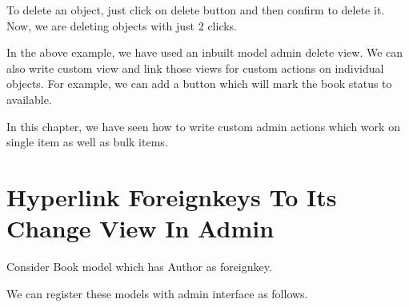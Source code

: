 \documentclass[letterpaper,11pt,english]{sphinxmanual}
\begin{document}
To delete an object, just click on delete button and then confirm to delete it. Now, we are deleting objects with just 2 clicks.

In the above example, we have used an inbuilt model admin delete view. We can also write custom view and link those views for custom actions on individual objects. For example, we can add a button which will mark the book status to available.

In this chapter, we have seen how to write custom admin actions which work on single item as well as bulk items.


\chapter{Hyperlink Foreignkeys To Its Change View In Admin}
\label{\detokenize{admin_hyperlink_foreignkey:hyperlink-foreignkeys-to-its-change-view-in-admin}}\label{\detokenize{admin_hyperlink_foreignkey::doc}}
Consider Book model which has Author as foreignkey.

\begin{sphinxVerbatim}[commandchars=\\\{\}]
   


 
      

 
      
      
\end{sphinxVerbatim}

We can register these models with admin interface as follows.

\begin{sphinxVerbatim}[commandchars=\\\{\}]
   

    

 
        

 
\end{sphinxVerbatim}
\end{document}
